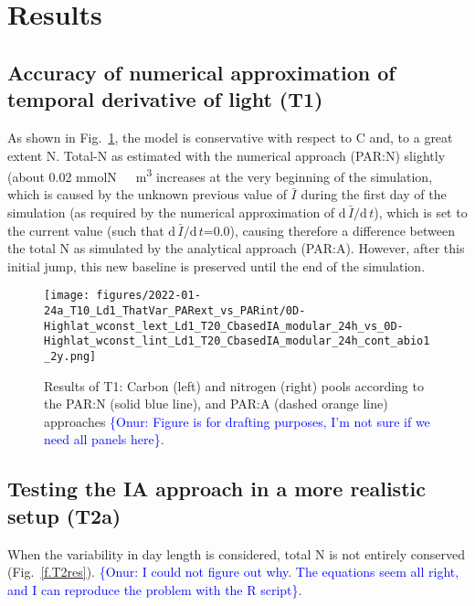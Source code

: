 \documentclass[gmd, manuscript, draft]{copernicus}
\newcommand{\onur}[1]{\textcolor{blue}{\{Onur: #1\}}}
\begin{document}


\section{Results}

\subsection{Accuracy of numerical approximation of temporal derivative of light (T1)}
As shown in Fig.~\ref{f.T1res}, the model is conservative with respect to C and, to a great extent N\@. Total-N as estimated with the numerical approach (PAR:N) slightly (about 0.02 \unit{mmolN\ m^3} increases at the very beginning of the simulation, which is caused by the unknown previous value of $\bar{I}$ during the first day of the simulation (as required by the numerical approximation of $\text{d}\,\bar{I}/\text{d}\,t$), which is set to the current value (such that $\text{d}\,\bar{I}/\text{d}\,t$=0.0), causing therefore a difference between the total N as simulated by the analytical approach (PAR:A). However, after this initial jump, this new baseline is preserved until the end of the simulation.

\begin{figure}[ht!]
\texttt{[image: figures/2022-01-24a\_T10\_Ld1\_ThatVar\_PARext\_vs\_PARint/0D-Highlat\_wconst\_lext\_Ld1\_T20\_CbasedIA\_modular\_24h\_vs\_0D-Highlat\_wconst\_lint\_Ld1\_T20\_CbasedIA\_modular\_24h\_cont\_abio1\_2y.png]}
\caption{Results of T1: Carbon (left) and nitrogen (right) pools according to the PAR:N (solid blue line), and PAR:A (dashed orange line) approaches \onur{Figure is for drafting purposes, I'm not sure if we need all panels here}.\label{f.T1res}}
\end{figure}

\FloatBarrier

\subsection{Testing the IA approach in a more realistic setup (T2a)}
When the variability in day length is considered, total N is not entirely conserved (Fig.~\ref{f.T2res}). \onur{I could not figure out why. The equations seem all right, and I can reproduce the problem with the R script}.
\end{document}
